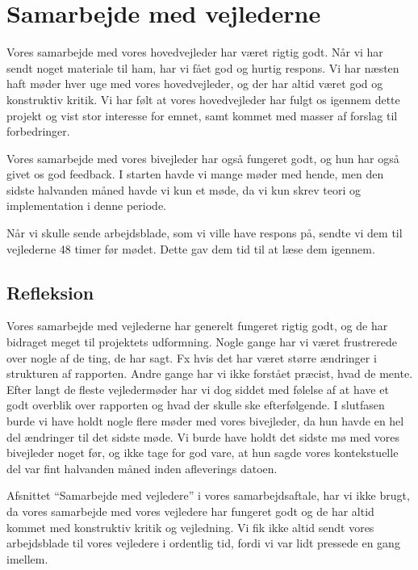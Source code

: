 \section{Samarbejde med vejlederne}
\label{H8R}

Vores samarbejde med vores hovedvejleder har v\ae{}ret rigtig godt. 
N\aa{}r vi har sendt noget materiale til ham, har vi f\aa{}et god og hurtig respons. 
Vi har n\ae{}sten haft m\o{}der hver uge med vores hovedvejleder, og der har altid v\ae{}ret god og
konstruktiv kritik. 
Vi har f\o{}lt at vores hovedvejleder har fulgt os igennem dette projekt og vist stor interesse for emnet, samt kommet med masser af forslag til forbedringer.

Vores samarbejde med vores bivejleder har ogs\aa{} fungeret godt, og hun har ogs\aa{} givet os god feedback. 
I starten havde vi mange m\o{}der med hende, men den sidste halvanden m\aa{}ned havde vi kun et m\o{}de, da vi kun skrev teori og implementation i denne periode.

N\aa{}r vi skulle sende arbejdsblade, som vi ville have respons p\aa{}, sendte vi dem til vejlederne 48 timer f\o{}r m\o{}det. Dette gav dem tid til at l\ae{}se dem igennem.

\subsection{Refleksion}
Vores samarbejde med vejlederne har generelt fungeret rigtig godt, og de har bidraget meget til projektets udformning. 
Nogle gange har vi v\ae{}ret frustrerede over nogle af de ting, de har sagt. 
Fx hvis det har v\ae{}ret st\o{}rre \ae{}ndringer i strukturen af rapporten. Andre gange har vi ikke forst\aa{}et pr\ae{}cist, hvad de
mente. 
Efter langt de fleste vejlederm\o{}der har vi dog siddet med f\o{}lelse af at have et godt overblik over rapporten og hvad der skulle ske efterf\o{}lgende. 
I slutfasen burde vi have holdt nogle flere m\o{}der med vores bivejleder, da hun havde en hel del \ae{}ndringer til det sidste m\o{}de. Vi burde have holdt det sidste m\o{} med vores bivejleder noget f\o{}r, og ikke tage for god vare, at hun sagde vores kontekstuelle del var fint halvanden m\aa{}ned inden afleverings datoen.


Afsnittet ``Samarbejde med vejledere'' i vores samarbejdsaftale, har vi ikke brugt, da vores samarbejde med vores vejledere har fungeret godt og de har altid kommet med konstruktiv kritik og vejledning. 
Vi fik ikke altid sendt vores arbejdsblade til vores vejledere i ordentlig tid, fordi vi var lidt pressede en gang imellem.

